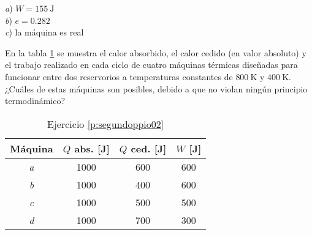 \begin{Answer}
	\begin{minipage}[t]{.4\textwidth}
    \textit{a}) $W = \SI{155}{\joule}$\\ \textit{b}) $e = 0.282$\\ \textit{c}) la máquina es real
  \end{minipage}
\end{Answer}
%
\begin{center}
\end{center}
%
\begin{Exercise}\label{p:segundoppio02}
  En la tabla \ref{t:segundoppio02} se muestra el calor absorbido, el calor cedido (en valor absoluto) y el trabajo realizado en cada ciclo de cuatro máquinas térmicas diseñadas para funcionar entre dos reservorios a temperaturas constantes de $\SI{800}{\kelvin}$ y $\SI{400}{\kelvin}$. ¿Cuáles de estas máquinas son posibles, debido a que no violan ningún principio termodinámico?\\
  \begin{table}[h]
    \caption{Ejercicio \ref{p:segundoppio02}}\label{t:segundoppio02}
    \centering
    \begin{tabular}{cccc}
        \hline
        \textbf{Máquina} & \textbf{$Q$ abs. [J]} & \textbf{$Q$ ced. [J]} & \textbf{$W$ [J]}\\
        \hline
        \textit{a} & 1000 & 600 & 600\\
        \textit{b} & 1000 & 400 & 600\\
        \textit{c} & 1000 & 500 & 500\\
        \textit{d} & 1000 & 700 & 300\\
        \hline
    \end{tabular}
  \end{table}
\end{Exercise}

